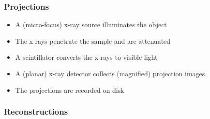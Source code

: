 \begin{frame}
	\frametitle{Projections}
	\begin{itemize}
		\item A (micro-focus) x-ray source illuminates the object
		\item The x-rays penetrate the sample and are attenuated
		\item A scintillator converts the x-rays to visible light
		\item A (planar) x-ray detector collects (magnified) projection images.
		\item The projections are recorded on disk
	\end{itemize}
\end{frame}

\begin{frame}
	\frametitle{Reconstructions}
	\centering
\end{frame}

